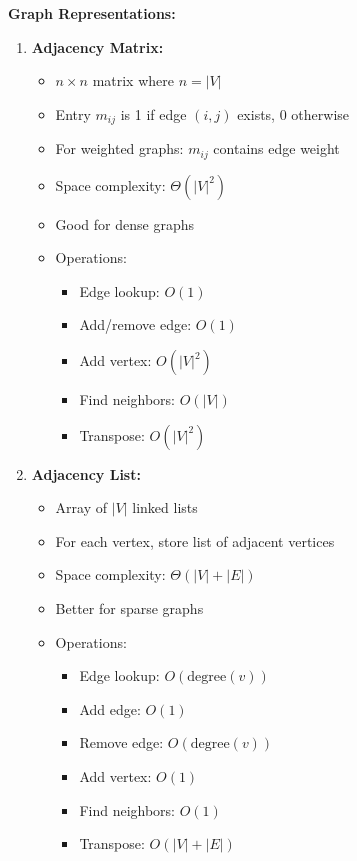 \textbf{Graph Representations:}
\begin{enumerate}[noitemsep]
    \item \textbf{Adjacency Matrix:}
        \begin{itemize}[noitemsep]
            \item $n \times n$ matrix where $n = |V|$
            \item Entry $m_{ij}$ is 1 if edge $(i,j)$ exists, 0 otherwise
            \item For weighted graphs: $m_{ij}$ contains edge weight
            \item Space complexity: $\Theta(|V|^2)$
            \item Good for dense graphs
            \item Operations:
                \begin{itemize}[noitemsep]
                    \item Edge lookup: $O(1)$
                    \item Add/remove edge: $O(1)$
                    \item Add vertex: $O(|V|^2)$
                    \item Find neighbors: $O(|V|)$
                    \item Transpose: $O(|V|^2)$
                \end{itemize}
        \end{itemize}
    \item \textbf{Adjacency List:}
        \begin{itemize}[noitemsep]
            \item Array of $|V|$ linked lists
            \item For each vertex, store list of adjacent vertices
            \item Space complexity: $\Theta(|V| + |E|)$
            \item Better for sparse graphs
            \item Operations:
                \begin{itemize}[noitemsep]
                    \item Edge lookup: $O(\text{degree}(v))$
                    \item Add edge: $O(1)$
                    \item Remove edge: $O(\text{degree}(v))$
                    \item Add vertex: $O(1)$
                    \item Find neighbors: $O(1)$
                    \item Transpose: $O(|V| + |E|)$
                \end{itemize}
        \end{itemize}
\end{enumerate}

